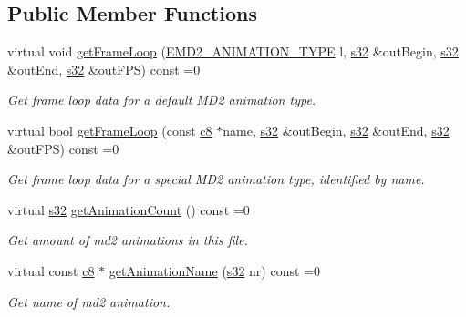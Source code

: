\subsection*{Public Member Functions}
\begin{DoxyCompactItemize}
\item 
virtual void \hyperlink{classirr_1_1scene_1_1IAnimatedMeshMD2_a0bab7f9b11fd11f1fa8f2cd6e085b596}{get\+Frame\+Loop} (\hyperlink{namespaceirr_1_1scene_a08d4a84966e1d2886d0d57e4acbb4f19}{E\+M\+D2\+\_\+\+A\+N\+I\+M\+A\+T\+I\+O\+N\+\_\+\+T\+Y\+PE} l, \hyperlink{namespaceirr_ac66849b7a6ed16e30ebede579f9b47c6}{s32} \&out\+Begin, \hyperlink{namespaceirr_ac66849b7a6ed16e30ebede579f9b47c6}{s32} \&out\+End, \hyperlink{namespaceirr_ac66849b7a6ed16e30ebede579f9b47c6}{s32} \&out\+F\+PS) const =0
\begin{DoxyCompactList}\small\item\em Get frame loop data for a default M\+D2 animation type. \end{DoxyCompactList}\item 
virtual bool \hyperlink{classirr_1_1scene_1_1IAnimatedMeshMD2_a4d52cae663c479d88296561ec961410a}{get\+Frame\+Loop} (const \hyperlink{namespaceirr_a9395eaea339bcb546b319e9c96bf7410}{c8} $\ast$name, \hyperlink{namespaceirr_ac66849b7a6ed16e30ebede579f9b47c6}{s32} \&out\+Begin, \hyperlink{namespaceirr_ac66849b7a6ed16e30ebede579f9b47c6}{s32} \&out\+End, \hyperlink{namespaceirr_ac66849b7a6ed16e30ebede579f9b47c6}{s32} \&out\+F\+PS) const =0
\begin{DoxyCompactList}\small\item\em Get frame loop data for a special M\+D2 animation type, identified by name. \end{DoxyCompactList}\item 
\mbox{\label{classirr_1_1scene_1_1IAnimatedMeshMD2_abb4479ea266ea54230bf21c36319b323}} 
virtual \hyperlink{namespaceirr_ac66849b7a6ed16e30ebede579f9b47c6}{s32} \hyperlink{classirr_1_1scene_1_1IAnimatedMeshMD2_abb4479ea266ea54230bf21c36319b323}{get\+Animation\+Count} () const =0
\begin{DoxyCompactList}\small\item\em Get amount of md2 animations in this file. \end{DoxyCompactList}\item 
virtual const \hyperlink{namespaceirr_a9395eaea339bcb546b319e9c96bf7410}{c8} $\ast$ \hyperlink{classirr_1_1scene_1_1IAnimatedMeshMD2_aa619158d0fc11ea1032d838abf3566ca}{get\+Animation\+Name} (\hyperlink{namespaceirr_ac66849b7a6ed16e30ebede579f9b47c6}{s32} nr) const =0
\begin{DoxyCompactList}\small\item\em Get name of md2 animation. \end{DoxyCompactList}\end{DoxyCompactItemize}
